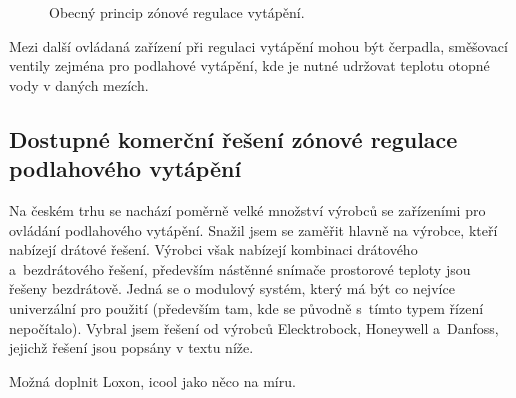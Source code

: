 \newpage
\begin{figure}[H]
    \centering
    \def\svgwidth{0.8\columnwidth}
    
    \caption{Obecný princip zónové regulace vytápění.}
    \label{fig:obecny-princip-zonove-regulace}
\end{figure}

Mezi další ovládaná zařízení při regulaci vytápění mohou být čerpadla, směšovací ventily zejména pro podlahové vytápění, kde je nutné udržovat teplotu otopné vody v daných mezích.

\subsection{Dostupné komerční řešení zónové regulace podlahového vytápění}


Na českém trhu se nachází poměrně velké množství výrobců se zařízeními pro ovládání podlahového vytápění. Snažil jsem se zaměřit hlavně na výrobce, kteří nabízejí drátové řešení. Výrobci však nabízejí kombinaci drátového a~bezdrátového řešení, především nástěnné snímače prostorové teploty jsou řešeny bezdrátově. Jedná se o modulový systém, který má být co nejvíce univerzální pro použití (především tam, kde se původně s~tímto typem řízení nepočítalo). Vybral jsem řešení od výrobců Elecktrobock, Honeywell a~Danfoss, jejichž řešení jsou popsány v textu níže.

Možná doplnit Loxon, icool jako něco na míru.


